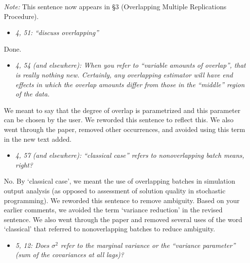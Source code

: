 \documentclass[11pt,notitlepage,onecolumn]{article}
\newcommand{\noi}{\noindent}
\begin{document}
\noi
{\it Note:}
This sentence now appears in \S 3 (Overlapping Multiple Replications Procedure). 
\medskip 


\begin{itemize}
\item[] \textit{4, 51: ``discuss overlapping''}
\end{itemize}

\noi
Done.  
\medskip 


\begin{itemize}
\item[] \textit{4, 54 (and elsewhere): When you refer to ``variable amounts of overlap'', that is really nothing new. Certainly, any overlapping estimator will have end effects in which the overlap amounts differ from those in the ``middle'' region of the data.}
\end{itemize}

\noi
We meant to say that the degree of overlap is parametrized and this parameter can be chosen by the user. 
We reworded this sentence to reflect this. 
We also went through the paper, removed other occurrences, and avoided using this term in the new text added. 
\medskip 



\begin{itemize}
\item[] \textit{4, 57 (and elsewhere): ``classical case'' refers to nonoverlapping batch means, right?}
\end{itemize}

\noi
No. By `classical case', we meant the use of overlapping batches in simulation output analysis (as opposed to assessment of solution quality in stochastic programming). 
We reworded this sentence to remove ambiguity. 
Based on your earlier comments, we avoided the term `variance reduction' in the revised sentence.
We also went through the paper and removed several uses of the word `classical' that referred to nonoverlapping batches to reduce ambiguity.
\medskip 



\begin{itemize}
\item[] \textit{5, 12: Does $\sigma^2$ refer to the marginal variance or the ``variance parameter'' (sum of the covariances at all lags)?}
\end{itemize}
\end{document}
